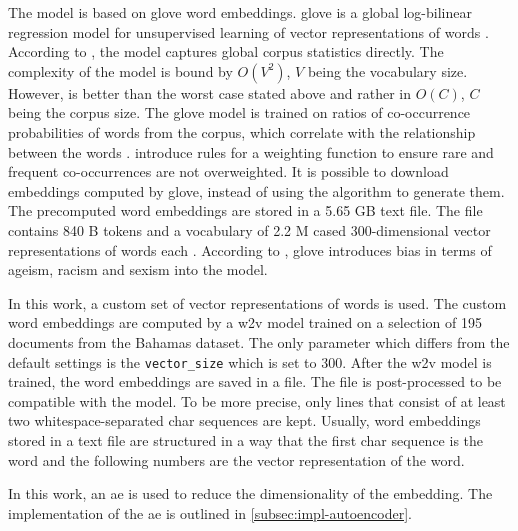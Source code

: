 The \infersent{} model is based on \acs{glove} word embeddings.
\acs{glove} is a global log-bilinear regression model for unsupervised learning of vector representations of words \cite{glove2014}. 
According to \citeauthor{glove2014}, the model captures global corpus statistics directly.
The complexity of the model is bound by $O(V^2)$, $V$ being the vocabulary size.
However, \citeauthor{glove2014} is better than the worst case stated above and rather in $O(C)$, $C$ being the corpus size.
The \acs{glove} model is trained on ratios of co-occurrence probabilities of words from the corpus, 
which correlate with the relationship between the words \cite{glove2014}.
\citeauthor{glove2014} introduce rules for a weighting function to ensure rare and frequent co-occurrences are not overweighted.
It is possible to download embeddings computed by \acs{glove}, instead of using the algorithm to generate them.
The precomputed word embeddings are stored in a 5.65 GB text file.
The file contains 840 B tokens and a vocabulary of 2.2 M cased 300-dimensional vector representations of words each \cite{download-glove}.
According to \citeauthor{UniversalSentEnc2018}, \acs{glove} introduces bias in terms of ageism, racism and sexism into the model.

In this work, a custom set of vector representations of words is used.
The custom word embeddings are computed by a \ac{w2v} model trained on a selection of 195 documents from the Bahamas dataset.
The only parameter which differs from the default settings is the \texttt{vector\_size} which is set to 300.
After the \ac{w2v} model is trained, the word embeddings are saved in a file.
The file is post-processed to be compatible with the \infersent{} model.
To be more precise, only lines that consist of at least two whitespace-separated char sequences are kept.
Usually, word embeddings stored in a text file are structured in a way that 
the first char sequence is the word and the following numbers are the vector representation of the word.

In this work, an \ac{ae} is used to reduce the dimensionality of the \infersent{} embedding.
The implementation of the \ac{ae} is outlined in \autoref{subsec:impl-autoencoder}.

